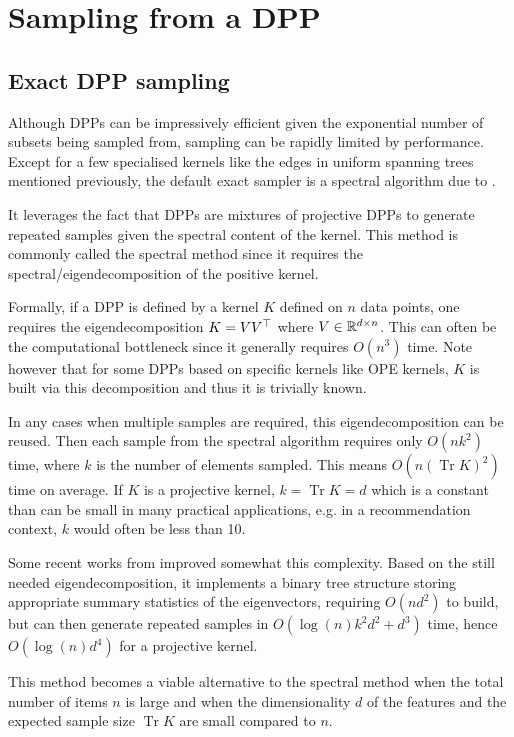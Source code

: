 \section{Sampling from a DPP}
\subsection{Exact DPP sampling}


Although DPPs can be impressively efficient given the exponential number of subsets being sampled from, sampling can be rapidly limited by performance. 
Except for a few specialised kernels like the edges in uniform spanning trees mentioned previously, the default exact sampler is a spectral algorithm due to \cite{hough2006_hkpv}.

It leverages the fact that DPPs are mixtures of projective DPPs to generate repeated samples given the spectral content of the kernel. This method is commonly called the spectral method since it requires the spectral/eigendecomposition of the positive kernel. 

Formally, if a DPP is defined by a kernel $K$ defined on $n$ data points, one requires the eigendecomposition $K= V V^\top$  where $V \in \mathbb{R}^{d \times n}$. 
This can often be the computational bottleneck since it generally requires $O(n^3)$ time. Note however that for some DPPs based on specific kernels like OPE kernels, $K$ is built via this decomposition and thus it is trivially known.

In any cases when multiple samples are required, this eigendecomposition can be reused. Then each sample from the spectral algorithm requires only $O(n k^2)$ time, where $k$ is the number of elements sampled. This means $O(n (\operatorname{Tr} K)^2)$ time on average. If $K$ is a projective kernel, $k = \operatorname{Tr} K = d$ which is a constant than can be small in many practical applications, e.g. in a recommendation context, $k$ would often be less than 10.

Some recent works from \cite{gillenwater2019_treebased_fast_dpp_sampling} improved somewhat this complexity. Based on the still needed eigendecomposition, it implements a binary tree structure storing appropriate summary statistics of the eigenvectors, requiring $O(n d^2)$ to build, but can then generate repeated
samples in $O(\log(n)k^2d^2 + d^3)$ time, hence $O(\log(n)d^4)$ for a projective kernel.

This method becomes a viable alternative to the spectral method when the total
number of items $n$ is large and when the dimensionality $d$ of the
features and the expected sample size $\operatorname{Tr} K$ are small compared to $n$.





